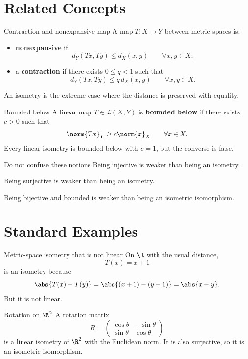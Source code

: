 \documentclass[11pt]{article}
\begin{document}
\section{Related Concepts}

\begin{defbox}{Contraction and nonexpansive map}
A map $T:X\to Y$ between metric spaces is:
\begin{itemize}
\item \textbf{nonexpansive} if
\[
d_Y(Tx,Ty)\le d_X(x,y) \qquad \forall x,y\in X;
\]
\item a \textbf{contraction} if there exists $0\le q<1$ such that
\[
d_Y(Tx,Ty)\le q\,d_X(x,y) \qquad \forall x,y\in X.
\]
\end{itemize}
An isometry is the extreme case where the distance is preserved with equality.
\end{defbox}

\begin{defbox}{Bounded below}
A linear map $T\in\mathcal L(X,Y)$ is \textbf{bounded below} if there exists $c>0$ such that
\[
\norm{Tx}_Y\ge c\norm{x}_X \qquad \forall x\in X.
\]
Every linear isometry is bounded below with $c=1$, but the converse is false.
\end{defbox}

\begin{warningbox}{Do not confuse these notions}
Being injective is weaker than being an isometry.

Being surjective is weaker than being an isometry.

Being bijective and bounded is weaker than being an isometric isomorphism.
\end{warningbox}

\section{Standard Examples}

\begin{exbox}{Metric-space isometry that is not linear}
On $\R$ with the usual distance,
\[
T(x)=x+1
\]
is an isometry because
\[
\abs{T(x)-T(y)}=\abs{(x+1)-(y+1)}=\abs{x-y}.
\]
But it is not linear.
\end{exbox}

\begin{exbox}{Rotation on $\R^2$}
A rotation matrix
\[
R=\begin{pmatrix}
\cos \theta & -\sin \theta\\
\sin \theta & \cos \theta
\end{pmatrix}
\]
is a linear isometry of $\R^2$ with the Euclidean norm. It is also surjective, so it is an isometric isomorphism.
\end{exbox}
\end{document}
